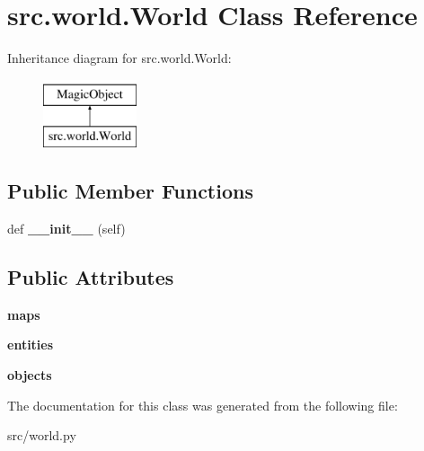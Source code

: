\hypertarget{classsrc_1_1world_1_1_world}{}\section{src.\+world.\+World Class Reference}
\label{classsrc_1_1world_1_1_world}
Inheritance diagram for src.\+world.\+World\+:\begin{figure}[H]
\begin{center}
\leavevmode
\includegraphics[height=2.000000cm]{classsrc_1_1world_1_1_world}
\end{center}
\end{figure}
\subsection*{Public Member Functions}
\begin{DoxyCompactItemize}
\item 
\hypertarget{classsrc_1_1world_1_1_world_aa092b775e110404c6e67bd455574c1a5}{}\label{classsrc_1_1world_1_1_world_aa092b775e110404c6e67bd455574c1a5} 
def {\bfseries \+\_\+\+\_\+init\+\_\+\+\_\+} (self)
\end{DoxyCompactItemize}
\subsection*{Public Attributes}
\begin{DoxyCompactItemize}
\item 
\hypertarget{classsrc_1_1world_1_1_world_a602b8fbae2d1fa60b122e671093b17bb}{}\label{classsrc_1_1world_1_1_world_a602b8fbae2d1fa60b122e671093b17bb} 
{\bfseries maps}
\item 
\hypertarget{classsrc_1_1world_1_1_world_a70145ce6dd5e9ce1e02d9585501b6420}{}\label{classsrc_1_1world_1_1_world_a70145ce6dd5e9ce1e02d9585501b6420} 
{\bfseries entities}
\item 
\hypertarget{classsrc_1_1world_1_1_world_a4cad7319ffcf3f4c4a531647a3a6a90c}{}\label{classsrc_1_1world_1_1_world_a4cad7319ffcf3f4c4a531647a3a6a90c} 
{\bfseries objects}
\end{DoxyCompactItemize}


The documentation for this class was generated from the following file\+:\begin{DoxyCompactItemize}
\item 
src/world.\+py\end{DoxyCompactItemize}
